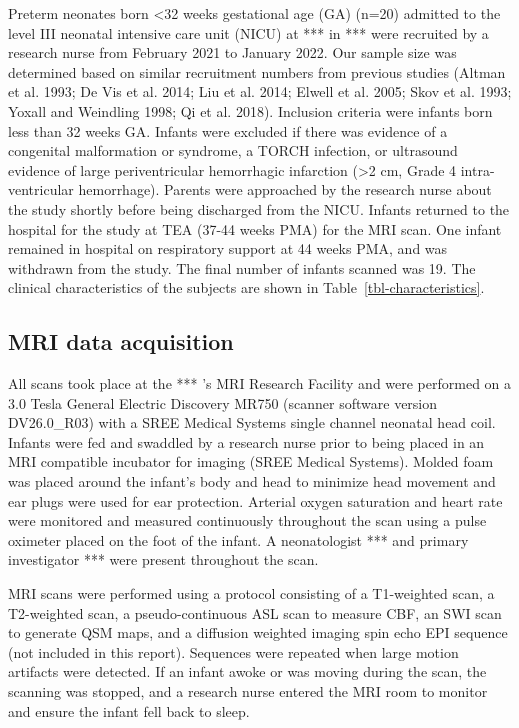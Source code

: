 \documentclass[
  letterpaper,
  DIV=11,
  numbers=noendperiod]{scrartcl}
\begin{document}
Preterm neonates born \textless32 weeks gestational age (GA) (n=20)
admitted to the level III neonatal intensive care unit (NICU) at *** in
*** were recruited by a research nurse from February 2021 to January
2022. Our sample size was determined based on similar recruitment
numbers from previous studies (Altman et al. 1993; De Vis et al. 2014;
Liu et al. 2014; Elwell et al. 2005; Skov et al. 1993; Yoxall and
Weindling 1998; Qi et al. 2018). Inclusion criteria were infants born
less than 32 weeks GA. Infants were excluded if there was evidence of a
congenital malformation or syndrome, a TORCH infection, or ultrasound
evidence of large periventricular hemorrhagic infarction (\textgreater2
cm, Grade 4 intra-ventricular hemorrhage). Parents were approached by
the research nurse about the study shortly before being discharged from
the NICU. Infants returned to the hospital for the study at TEA (37-44
weeks PMA) for the MRI scan. One infant remained in hospital on
respiratory support at 44 weeks PMA, and was withdrawn from the study.
The final number of infants scanned was 19. The clinical characteristics
of the subjects are shown in Table~\ref{tbl-characteristics}.

\subsection{MRI data acquisition}\label{mri-data-acquisition}

All scans took place at the *** 's MRI Research Facility and were
performed on a 3.0 Tesla General Electric Discovery MR750 (scanner
software version DV26.0\_R03) with a SREE Medical Systems single channel
neonatal head coil. Infants were fed and swaddled by a research nurse
prior to being placed in an MRI compatible incubator for imaging (SREE
Medical Systems). Molded foam was placed around the infant's body and
head to minimize head movement and ear plugs were used for ear
protection. Arterial oxygen saturation and heart rate were monitored and
measured continuously throughout the scan using a pulse oximeter placed
on the foot of the infant. A neonatologist *** and primary investigator
*** were present throughout the scan.

MRI scans were performed using a protocol consisting of a T1-weighted
scan, a T2-weighted scan, a pseudo-continuous ASL scan to measure CBF,
an SWI scan to generate QSM maps, and a diffusion weighted imaging spin
echo EPI sequence (not included in this report). Sequences were repeated
when large motion artifacts were detected. If an infant awoke or was
moving during the scan, the scanning was stopped, and a research nurse
entered the MRI room to monitor and ensure the infant fell back to
sleep.
\end{document}
